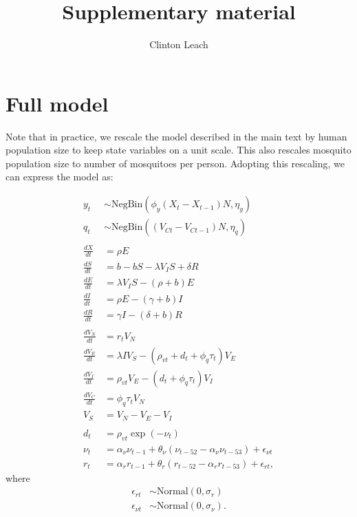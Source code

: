 \documentclass[12pt,letterpaper]{article}
\title{Supplementary material}
\author{Clinton Leach}
\begin{document}
\maketitle


\section*{Full model}

Note that in practice, we rescale the model described in the main text by human population size to keep state variables on a unit scale.
This also rescales mosquito population size to number of mosquitoes per person.
Adopting this rescaling, we can express the model as:

\begin{align}
y_t & \sim \text{NegBin}(\phi_y  (X_t - X_{t-1})N, \eta_y)\\
q_t & \sim \text{NegBin}((V_{Ct} - V_{Ct-1})N, \eta_q)\\
\\
\frac{dX}{dt} &= \rho E \\
\frac{dS}{dt} &= b - bS - \lambda V_{I}S + \delta R\\
\frac{dE}{dt} &= \lambda V_{I}S - (\rho + b)E\\
\frac{dI}{dt} &= \rho E - (\gamma + b)I\\
\frac{dR}{dt} &= \gamma I - (\delta + b)R\\
\\
\frac{dV_N}{dt} & = r_t V_N \\
\frac{dV_E}{dt} &= \lambda IV_S - (\rho_{vt} + d_t + \phi_q \tau_t)V_E\\
\frac{dV_I}{dt} &= \rho_{vt} V_E - (d_t + \phi_q \tau_t) V_I\\
\frac{dV_C}{dt} & = \phi_q \tau_t V_N\\
V_S &= V_N - V_E - V_I\\
\\
d_t &= \rho_{vt} \exp(-\nu_t)\\
\nu_{t} & = \alpha_{\nu} \nu_{t-1} + \theta_{\nu} (\nu_{t-52} - \alpha_{\nu} \nu_{t-53}) +\epsilon_{\nu t}\\
r_t &= \alpha_r r_{t-1} + \theta_r (r_{t-52} - \alpha_r r_{t-53}) + \epsilon_{rt},
\end{align}
where
\begin{align}
\epsilon_{rt} & \sim \text{Normal}(0, \sigma_r)\\
\epsilon_{\nu t} & \sim \text{Normal}(0, \sigma_{\nu}).
\end{align}
\end{document}
